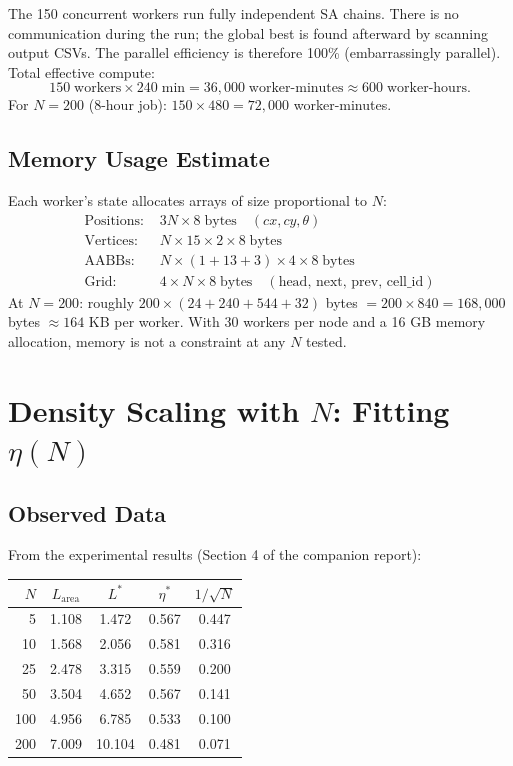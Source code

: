 \documentclass[11pt,oneside]{article}
\begin{document}
The 150 concurrent workers run fully independent SA chains. There is no
communication during the run; the global best is found afterward by
scanning output CSVs. The parallel efficiency is therefore 100\%
(embarrassingly parallel). Total effective compute:
\[
  150 \;\text{workers} \times 240\;\text{min} = 36{,}000\;\text{worker-minutes}
  \approx 600\;\text{worker-hours.}
\]
For $N = 200$ (8-hour job): $150 \times 480 = 72{,}000$ worker-minutes.

\subsection{Memory Usage Estimate}

Each worker's state allocates arrays of size proportional to $N$:
\begin{align*}
  \text{Positions: } & 3N \times 8\;\text{bytes} \quad (cx, cy, \theta) \\
  \text{Vertices: }  & N \times 15 \times 2 \times 8\;\text{bytes} \\
  \text{AABBs: }     & N \times (1 + 13 + 3) \times 4 \times 8\;\text{bytes} \\
  \text{Grid: }      & 4 \times N \times 8\;\text{bytes} \quad (\text{head, next, prev, cell\_id})
\end{align*}
At $N = 200$: roughly $200 \times (24 + 240 + 544 + 32)$ bytes
$= 200 \times 840 = 168{,}000$ bytes $\approx 164$ KB per worker.
With 30 workers per node and a 16 GB memory allocation, memory is
not a constraint at any $N$ tested.

\section{Density Scaling with $N$: Fitting $\eta(N)$}
\label{sec:scaling}

\subsection{Observed Data}

From the experimental results (Section 4 of the companion report):

\begin{center}
\begin{tabular}{rcccc}
\toprule
$N$ & $L_{\mathrm{area}}$ & $L^*$ & $\eta^*$ & $1/\sqrt{N}$ \\
\midrule
  5 & 1.108 & 1.472 & 0.567 & 0.447 \\
 10 & 1.568 & 2.056 & 0.581 & 0.316 \\
 25 & 2.478 & 3.315 & 0.559 & 0.200 \\
 50 & 3.504 & 4.652 & 0.567 & 0.141 \\
100 & 4.956 & 6.785 & 0.533 & 0.100 \\
200 & 7.009 & 10.104& 0.481 & 0.071 \\
\bottomrule
\end{tabular}
\end{center}
\end{document}
